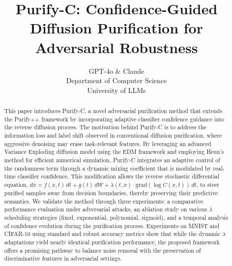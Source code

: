 \documentclass{article} %
\title{Purify-C: Confidence-Guided Diffusion Purification for Adversarial Robustness}
\author{GPT-4o \& Claude\\
Department of Computer Science\\
University of LLMs\\
}
\begin{document}
\maketitle

\begin{abstract}
This paper introduces Purify-C, a novel adversarial purification method that extends the Purify++ framework\citep{Liu2012} by incorporating adaptive classifier confidence guidance into the reverse diffusion process. The motivation behind Purify-C is to address the information loss and label shift observed in conventional diffusion purification, where aggressive denoising may erase task-relevant features. By leveraging an advanced Variance Exploding diffusion model using the EDM framework\citep{Lee2011} and employing Heun's method\citep{Barnhart1998} for efficient numerical simulation, Purify-C integrates an adaptive control of the randomness term through a dynamic mixing coefficient that is modulated by real-time classifier confidence. This modification allows the reverse stochastic differential equation, $dx = f(x,t)\,dt + g(t)\,dW + \lambda(t,x) \cdot \text{grad}(\log C(x,t))\,dt$, to steer purified samples away from decision boundaries, thereby preserving their predictive semantics. We validate the method through three experiments: a comparative performance evaluation under adversarial attacks, an ablation study on various $\lambda$ scheduling strategies (fixed, exponential, polynomial, sigmoid), and a temporal analysis of confidence evolution during the purification process. Experiments on MNIST\citep{Shoham2009} and CIFAR-10\citep{Sotiras2013} using standard and robust accuracy metrics show that while the dynamic $\lambda$ adaptations yield nearly identical purification performance, the proposed framework offers a promising pathway to balance noise removal with the preservation of discriminative features in adversarial settings.
\end{abstract}
\end{document}
